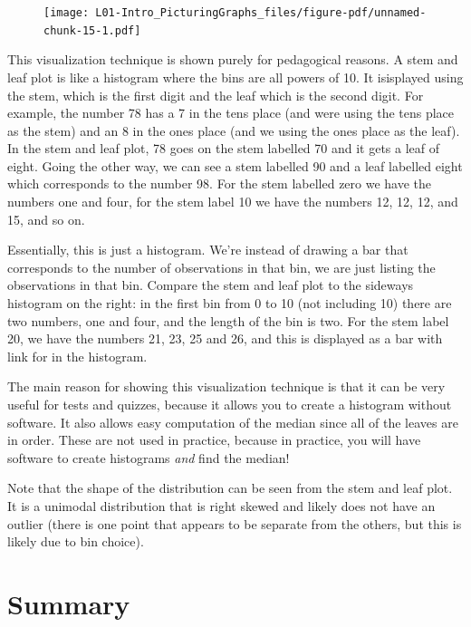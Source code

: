 \documentclass[
  letterpaper,
  DIV=11,
  numbers=noendperiod]{scrreprt}
\begin{document}
\begin{figure}[H]

{\centering \texttt{[image: L01-Intro\_PicturingGraphs\_files/figure-pdf/unnamed-chunk-15-1.pdf]}

}

\end{figure}

This visualization technique is shown purely for pedagogical reasons. A
stem and leaf plot is like a histogram where the bins are all powers of
10. It isisplayed using the stem, which is the first digit and the leaf
which is the second digit. For example, the number 78 has a 7 in the
tens place (and were using the tens place as the stem) and an 8 in the
ones place (and we using the ones place as the leaf). In the stem and
leaf plot, 78 goes on the stem labelled 70 and it gets a leaf of eight.
Going the other way, we can see a stem labelled 90 and a leaf labelled
eight which corresponds to the number 98. For the stem labelled zero we
have the numbers one and four, for the stem label 10 we have the numbers
12, 12, 12, and 15, and so on.

Essentially, this is just a histogram. We're instead of drawing a bar
that corresponds to the number of observations in that bin, we are just
listing the observations in that bin. Compare the stem and leaf plot to
the sideways histogram on the right: in the first bin from 0 to 10 (not
including 10) there are two numbers, one and four, and the length of the
bin is two. For the stem label 20, we have the numbers 21, 23, 25 and
26, and this is displayed as a bar with link for in the histogram.

The main reason for showing this visualization technique is that it can
be very useful for tests and quizzes, because it allows you to create a
histogram without software. It also allows easy computation of the
median since all of the leaves are in order. These are not used in
practice, because in practice, you will have software to create
histograms \emph{and} find the median!

Note that the shape of the distribution can be seen from the stem and
leaf plot. It is a unimodal distribution that is right skewed and likely
does not have an outlier (there is one point that appears to be separate
from the others, but this is likely due to bin choice).

\hypertarget{summary}{%
\section{Summary}\label{summary}}
\end{document}
